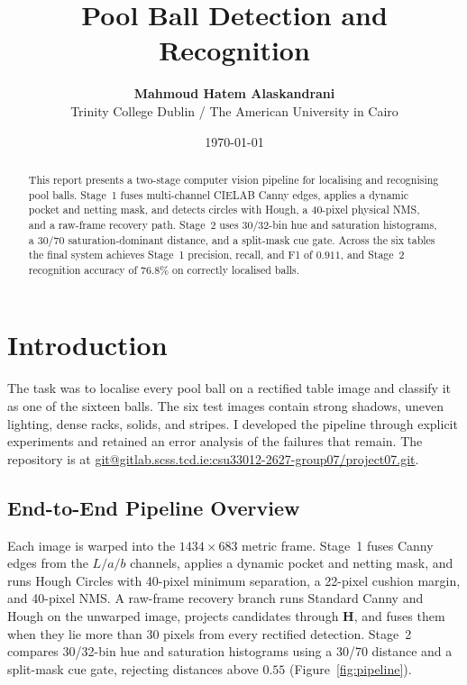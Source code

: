 \documentclass[12pt,a4paper]{article}
\title{\vspace{-1.4cm}\textbf{Pool Ball Detection and Recognition}}
\author{\textbf{Mahmoud Hatem Alaskandrani}\\[0.25em]
Trinity College Dublin / The American University in Cairo}
\date{\today}
\begin{document}
\maketitle
\thispagestyle{fancy}

\begin{abstract}
This report presents a two-stage computer vision pipeline for localising and recognising pool balls. Stage~1 fuses multi-channel CIELAB Canny edges, applies a dynamic pocket and netting mask, and detects circles with Hough, a 40-pixel physical NMS, and a raw-frame recovery path. Stage~2 uses 30/32-bin hue and saturation histograms, a 30/70 saturation-dominant distance, and a split-mask cue gate. Across the six tables the final system achieves Stage~1 precision, recall, and F1 of $0.911$, and Stage~2 recognition accuracy of $76.8\%$ on correctly localised balls.
\end{abstract}

\section{Introduction}

The task was to localise every pool ball on a rectified table image and classify it as one of the sixteen balls. The six test images contain strong shadows, uneven lighting, dense racks, solids, and stripes. I developed the pipeline through explicit experiments and retained an error analysis of the failures that remain. The repository is at \url{git@gitlab.scss.tcd.ie:csu33012-2627-group07/project07.git}.

\subsection{End-to-End Pipeline Overview}

Each image is warped into the $1434\times683$ metric frame. Stage~1 fuses Canny edges from the $L/a/b$ channels, applies a dynamic pocket and netting mask, and runs Hough Circles with 40-pixel minimum separation, a 22-pixel cushion margin, and 40-pixel NMS. A raw-frame recovery branch runs Standard Canny and Hough on the unwarped image, projects candidates through $\mathbf{H}$, and fuses them when they lie more than 30 pixels from every rectified detection. Stage~2 compares 30/32-bin hue and saturation histograms using a 30/70 distance and a split-mask cue gate, rejecting distances above $0.55$ (Figure~\ref{fig:pipeline}).
\end{document}
